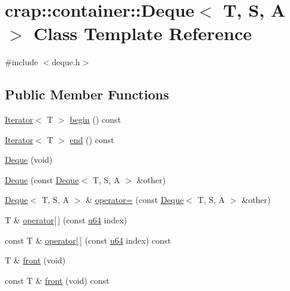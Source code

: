\hypertarget{classcrap_1_1container_1_1_deque}{\section{crap\-:\-:container\-:\-:Deque$<$ T, S, A $>$ Class Template Reference}
\label{classcrap_1_1container_1_1_deque}
}


{\ttfamily \#include $<$deque.\-h$>$}

\subsection*{Public Member Functions}
\begin{DoxyCompactItemize}
\item 
\hyperlink{class_iterator}{Iterator}$<$ T $>$ \hyperlink{classcrap_1_1container_1_1_deque_ad36e0df98057386c181b180e92bcf22a}{begin} () const 
\item 
\hyperlink{class_iterator}{Iterator}$<$ T $>$ \hyperlink{classcrap_1_1container_1_1_deque_abdc37abbc75bb0bd840afc76512b3a32}{end} () const 
\item 
\hyperlink{classcrap_1_1container_1_1_deque_a38a3b5b40a92fe283caaf87f893becc5}{Deque} (void)
\item 
\hyperlink{classcrap_1_1container_1_1_deque_a8123d827f53293022e7387e40690c56d}{Deque} (const \hyperlink{classcrap_1_1container_1_1_deque}{Deque}$<$ T, S, A $>$ \&other)
\item 
\hyperlink{classcrap_1_1container_1_1_deque}{Deque}$<$ T, S, A $>$ \& \hyperlink{classcrap_1_1container_1_1_deque_a4b264f33e2364f0a5c11ba432a45a88f}{operator=} (const \hyperlink{classcrap_1_1container_1_1_deque}{Deque}$<$ T, S, A $>$ \&other)
\item 
T \& \hyperlink{classcrap_1_1container_1_1_deque_aea587674c04c94053813589d150ff033}{operator\mbox{[}$\,$\mbox{]}} (const \hyperlink{types_8h_a3f7e2bcbb0b4c338f3c4f6c937cd4234}{u64} index)
\item 
const T \& \hyperlink{classcrap_1_1container_1_1_deque_a6c89705377c6d669b4fecf247eea26ea}{operator\mbox{[}$\,$\mbox{]}} (const \hyperlink{types_8h_a3f7e2bcbb0b4c338f3c4f6c937cd4234}{u64} index) const 
\item 
T \& \hyperlink{classcrap_1_1container_1_1_deque_a5d512da7fa47637855a58bc2d02c3be7}{front} (void)
\item 
const T \& \hyperlink{classcrap_1_1container_1_1_deque_af97a160e7935cb0ecd9612a762a69774}{front} (void) const 

\end{DoxyCompactItemize}

